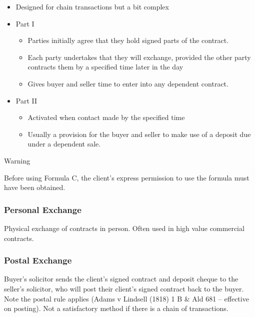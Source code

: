 \documentclass[
]{article}
\providecommand{\tightlist}{%
  \setlength{\itemsep}{0pt}\setlength{\parskip}{0pt}}
\newenvironment{env-6551cd31-4c34-4de5-9b70-48dd453ea5fd}
{
    \savenotes\tcolorbox[blanker,breakable,left=5pt,borderline west={2pt}{-4pt}{orange}]
}
{
    \endtcolorbox\spewnotes
}
\begin{document}
\begin{itemize}
\tightlist
\item
  Designed for chain transactions but a bit complex
\item
  Part I

  \begin{itemize}
  \tightlist
  \item
    Parties initially agree that they hold signed parts of the contract.
  \item
    Each party undertakes that they will exchange, provided the other
    party contracts them by a specified time later in the day
  \item
    Gives buyer and seller time to enter into any dependent contract.
  \end{itemize}
\item
  Part II

  \begin{itemize}
  \tightlist
  \item
    Activated when contact made by the specified time
  \item
    Usually a provision for the buyer and seller to make use of a
    deposit due under a dependent sale.
  \end{itemize}
\end{itemize}

\begin{env-6551cd31-4c34-4de5-9b70-48dd453ea5fd}

Warning

Before using Formula C, the client's express permission to use the
formula must have been obtained.

\end{env-6551cd31-4c34-4de5-9b70-48dd453ea5fd}

\hypertarget{personal-exchange}{%
\subsubsection{Personal Exchange}\label{personal-exchange}}

Physical exchange of contracts in person. Often used in high value
commercial contracts.

\hypertarget{postal-exchange}{%
\subsubsection{Postal Exchange}\label{postal-exchange}}

Buyer's solicitor sends the client's signed contract and deposit cheque
to the seller's solicitor, who will post their client's signed contract
back to the buyer. Note the postal rule applies (Adams v Lindsell (1818)
1 B \& Ald 681 -- effective on posting). Not a satisfactory method if
there is a chain of transactions.
\end{document}

